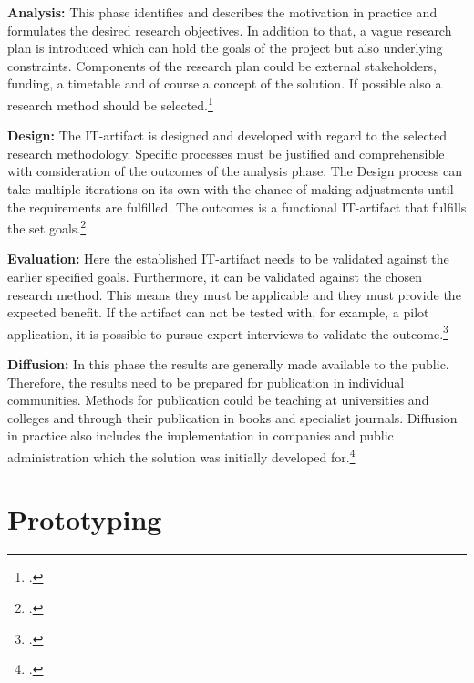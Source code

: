 \textbf{Analysis:} This phase identifies and describes the motivation in practice and formulates the desired research objectives.
In addition to that, a vague research plan is introduced which can hold the goals of the project but also underlying constraints. 
Components of the research plan could be external stakeholders, funding, a timetable and of course a concept of the solution.
If possible also a research method should be selected.\footcite[cf.][4]{oesterleMemorandumZurGestaltungsorientierten2010}

\textbf{Design:} The \ac{IT}-artifact is designed and developed with regard to the selected research methodology. 
Specific processes must be justified and comprehensible with consideration of the outcomes of the analysis phase.
The Design process can take multiple iterations on its own with the chance of making adjustments until the requirements are fulfilled.
The outcomes is a functional \ac{IT}-artifact that fulfills the set goals.\footcite[cf.][279]{oesterleKonsortialforschung2010}

\textbf{Evaluation:} Here the established \ac{IT}-artifact needs to be validated against the earlier specified goals. 
Furthermore, it can be validated against the chosen research method. 
This means they must be applicable and they must provide the expected benefit.
If the artifact can not be tested with, for example, a pilot application, it is possible to pursue expert interviews to validate the outcome.\footcite[cf.][279]{oesterleKonsortialforschung2010}

\textbf{Diffusion:} In this phase the results are generally made available to the public.
Therefore, the results need to be prepared for publication in individual communities.
Methods for publication could be teaching at universities and colleges and through their publication in books and specialist journals.
Diffusion in practice also includes the implementation in companies and public administration which the solution was initially developed for.\footcite[cf.][5]{oesterleMemorandumZurGestaltungsorientierten2010}

\section{Prototyping}

